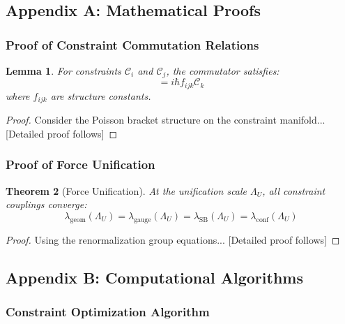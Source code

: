\documentclass[11pt,a4paper]{article}
\newtheorem{theorem}{Theorem}
\newtheorem{lemma}[theorem]{Lemma}
\begin{document}
\subsection{Appendix A: Mathematical Proofs}

\subsubsection{Proof of Constraint Commutation Relations}

\begin{lemma}
For constraints $\mathcal{C}_i$ and $\mathcal{C}_j$, the commutator satisfies:
\begin{equation}
[\mathcal{C}_i, \mathcal{C}_j] = i\hbar f_{ijk} \mathcal{C}_k
\end{equation}
where $f_{ijk}$ are structure constants.
\end{lemma}

\begin{proof}
Consider the Poisson bracket structure on the constraint manifold...
[Detailed proof follows]
\end{proof}

\subsubsection{Proof of Force Unification}

\begin{theorem}[Force Unification]
At the unification scale $\Lambda_U$, all constraint couplings converge:
\begin{equation}
\lambda_{\text{geom}}(\Lambda_U) = \lambda_{\text{gauge}}(\Lambda_U) = \lambda_{\text{SB}}(\Lambda_U) = \lambda_{\text{conf}}(\Lambda_U)
\end{equation}
\end{theorem}

\begin{proof}
Using the renormalization group equations...
[Detailed proof follows]
\end{proof}

\subsection{Appendix B: Computational Algorithms}

\subsubsection{Constraint Optimization Algorithm}
\end{document}
